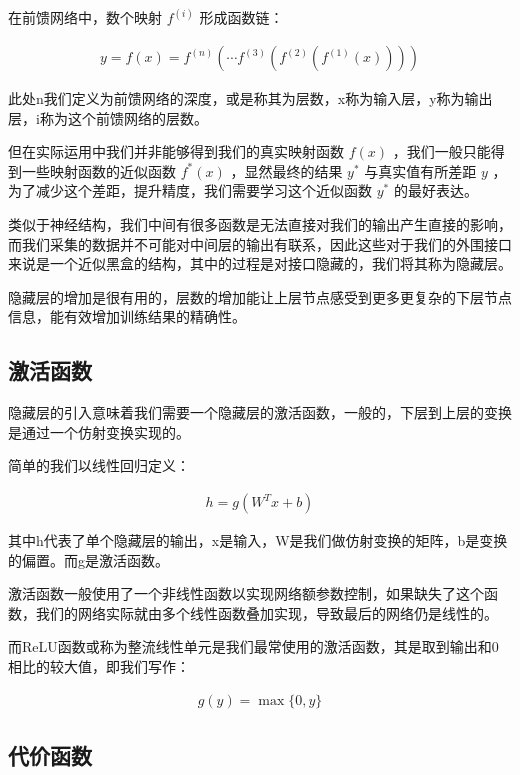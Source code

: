在前馈网络中，数个映射 $ f^{(i)} $ 形成函数链：

\begin{eqnarray}
    y = f(x) = f^{(n)}(\cdots f^{(3)}(f^{(2)}(f^{(1)}(x))))
\end{eqnarray}

此处n我们定义为前馈网络的深度，或是称其为层数，x称为输入层，y称为输出层，i称为这个前馈网络的层数。

但在实际运用中我们并非能够得到我们的真实映射函数 $ f(x) $ ，我们一般只能得到一些映射函数的近似函数 $ f^{\ast}(x) $ ，显然最终的结果 $ y^{\ast} $ 与真实值有所差距 $ y $ ，为了减少这个差距，提升精度，我们需要学习这个近似函数 $ y^{\ast} $ 的最好表达。

类似于神经结构，我们中间有很多函数是无法直接对我们的输出产生直接的影响，而我们采集的数据并不可能对中间层的输出有联系，因此这些对于我们的外围接口来说是一个近似黑盒的结构，其中的过程是对接口隐藏的，我们将其称为隐藏层。

隐藏层的增加是很有用的，层数的增加能让上层节点感受到更多更复杂的下层节点信息，能有效增加训练结果的精确性。

\subsection{激活函数}

隐藏层的引入意味着我们需要一个隐藏层的激活函数，一般的，下层到上层的变换是通过一个仿射变换实现的。

简单的我们以线性回归定义：

\begin{eqnarray}
    h = g(W^Tx+b)
\end{eqnarray}
 
其中h代表了单个隐藏层的输出，x是输入，W是我们做仿射变换的矩阵，b是变换的偏置。而g是激活函数。

激活函数一般使用了一个非线性函数以实现网络额参数控制，如果缺失了这个函数，我们的网络实际就由多个线性函数叠加实现，导致最后的网络仍是线性的。

而ReLU函数或称为整流线性单元是我们最常使用的激活函数，其是取到输出和0相比的较大值，即我们写作：

\begin{eqnarray}
    g(y) = \max \lbrace 0,y \rbrace
\end{eqnarray}

\subsection{代价函数}

